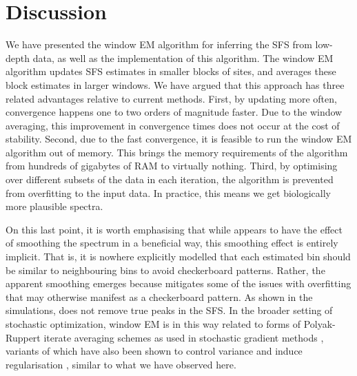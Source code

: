 \section{Discussion}

We have presented the window EM algorithm for inferring the SFS from low-depth data, as well as the \winsfs implementation of this algorithm.
The window EM algorithm updates SFS estimates in smaller blocks of sites, and averages these block estimates in larger windows.
We have argued that this approach has three related advantages relative to current methods.
First, by updating more often, convergence happens one to two orders of magnitude faster.
Due to the window averaging, this improvement in convergence times does not occur at the cost of stability.
Second, due to the fast convergence, it is feasible to run the window EM algorithm out of memory.
This brings the memory requirements of the algorithm from hundreds of gigabytes of RAM to virtually nothing.
Third, by optimising over different subsets of the data in each iteration, the algorithm is prevented from overfitting to the input data.
In practice, this means we get biologically more plausible spectra.

On this last point, it is worth emphasising that while \winsfs appears to have the effect of smoothing the spectrum in a beneficial way, this smoothing effect is entirely implicit.
That is, it is nowhere explicitly modelled that each estimated bin should be similar to neighbouring bins to avoid checkerboard patterns.
Rather, the apparent smoothing emerges because \winsfs mitigates some of the issues with overfitting that may otherwise manifest as a checkerboard pattern.
As shown in the simulations, \winsfs does not remove true peaks in the SFS.
In the broader setting of stochastic optimization, window EM is in this way related to forms of Polyak-Ruppert iterate averaging schemes as used in stochastic gradient methods \cite{Ruppert1988, Polyak1992}, variants of which have also been shown to control variance and induce regularisation \cite{Jain2018, Neu2018}, similar to what we have observed here.


